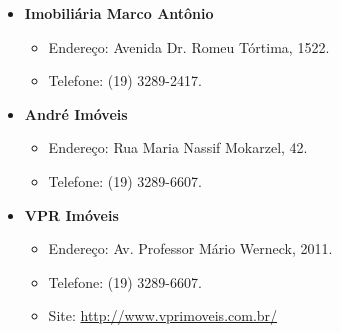 \begin{itemize}
\item  \textbf{Imobiliária Marco Antônio}
\begin{itemize}
\item  Endereço: Avenida Dr. Romeu Tórtima, 1522.
\item  Telefone: (19) 3289-2417.
\end{itemize}
\end{itemize}

\begin{itemize}
\item  \textbf{André Imóveis}
\begin{itemize}
\item  Endereço: Rua Maria Nassif Mokarzel, 42.
\item  Telefone: (19) 3289-6607.
\end{itemize}
\end{itemize}

\begin{itemize}
\item  \textbf{VPR Imóveis}
\begin{itemize}
\item  Endereço: Av. Professor Mário Werneck, 2011.
\item  Telefone: (19) 3289-6607.
\item  Site: \url{http://www.vprimoveis.com.br/}
\end{itemize}
\end{itemize}
